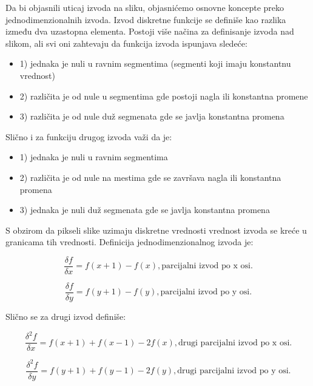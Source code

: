 \documentclass[a4paper,12pt,titlepage]{article}
\begin{document}
Da bi objasnili uticaj izvoda na sliku, objasnićemo osnovne koncepte preko jednodimenzionalnih izvoda. Izvod diskretne funkcije se definiše kao razlika između dva uzastopna elementa. Postoji više načina za definisanje izvoda nad slikom, ali svi oni zahtevaju da funkcija izvoda ispunjava sledeće:
\begin{itemize}
\item 1) jednaka je nuli u ravnim segmentima (segmenti koji imaju konstantnu vrednost) 
\item 2) različita je od nule u segmentima gde postoji nagla ili konstantna promene 
\item 3) različita je od nule duž segmenata gde se javlja konstantna promena
\end{itemize}

Slično i za funkciju drugog izvoda važi da je: 

\begin{itemize}
\item 1) jednaka je nuli u ravnim segmentima 
\item 2) različita je od nule na mestima gde se završava nagla ili konstantna promena 
\item 3) jednaka je nuli duž segmenata gde se javlja konstantna promena 
\end{itemize}

S obzirom da pikseli slike uzimaju diskretne vrednosti vrednost izvoda se kreće u granicama tih vrednosti. Definicija jednodimenzionalnog izvoda je:

\begin{equation}\label{eq:izvod}
\dfrac{\delta f}{\delta x} = f(x + 1) - f(x), \text{parcijalni izvod po x osi}.
\end{equation}

\begin{equation}\label{eq:izvod123}
\dfrac{\delta f}{\delta y} = f(y + 1) - f(y), \text{parcijalni izvod po y osi}.
\end{equation}

Slično se za drugi izvod definiše:

\begin{equation}\label{eq:izvod2}
\dfrac{\delta^2 f}{\delta x} = f(x + 1) + f(x - 1) - 2f(x), \text{drugi parcijalni izvod po x osi}.
\end{equation}

\begin{equation}\label{eq:izvod1234}
\dfrac{\delta^2 f}{\delta y} = f(y + 1) + f(y - 1) - 2f(y), \text{drugi parcijalni izvod po y osi}.
\end{equation}
\end{document}

